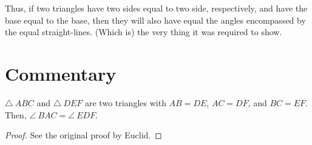 Thus, if two triangles have  two  sides equal to two side, respectively,
and  have the base equal to the base, then they will also have equal the angles  encompassed by
the equal straight-lines. (Which is) the very thing it was required to show.


\section*{Commentary}

\begin{proposition}\label{proposition_8}\leanok
    $\triangle~ABC$ and $\triangle~DEF$ are two triangles with $AB = DE$, $AC = DF$, and $BC = EF$. Then, $\angle~BAC = \angle~EDF$.
\end{proposition}
\begin{proof}
    \leanok
    See the original proof by Euclid.
\end{proof}
